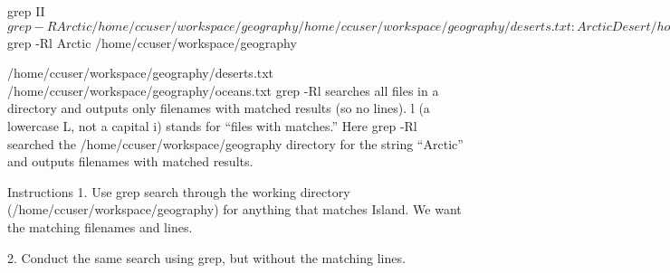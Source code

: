 grep II
        $ grep -R Arctic /home/ccuser/workspace/geography
        
        /home/ccuser/workspace/geography/deserts.txt:Arctic Desert
        /home/ccuser/workspace/geography/oceans.txt:Arctic Ocean
    grep -R searches all files in a directory and outputs filenames and lines containing matched results. -R stands for “recursive”. Above, grep -R searched the /home/ccuser/workspace/geography directory for the string “Arctic” and outputted filenames and lines with matching results.

        $ grep -Rl Arctic /home/ccuser/workspace/geography
        
        /home/ccuser/workspace/geography/deserts.txt
        /home/ccuser/workspace/geography/oceans.txt
    grep -Rl searches all files in a directory and outputs only filenames with matched results (so no lines). l (a lowercase L, not a capital i) stands for “files with matches.” Here grep -Rl searched the 
        /home/ccuser/workspace/geography
    directory for the string “Arctic” and outputs filenames with matched results.

Instructions
    1.
    Use grep search through the working directory (/home/ccuser/workspace/geography) for anything that matches Island. We want the matching filenames and lines.

    2.
    Conduct the same search using grep, but without the matching lines.